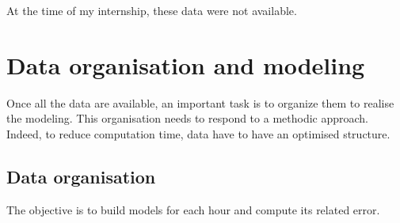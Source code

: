 \documentclass[12pt,twoside]{reedthesis}
\theoremstyle{definition}
\theoremstyle{definition}
\theoremstyle{definition}
\theoremstyle{remark}
\begin{document}
At the time of my internship, these data were not available.

\chapter{Data organisation and modeling}\label{data-model}

Once all the data are available, an important task is to organize them
to realise the modeling. This organisation needs to respond to a
methodic approach. Indeed, to reduce computation time, data have to have
an optimised structure.

\section{Data organisation}\label{data-organisation}

The objective is to build models for each hour and compute its related
error.
\end{document}
